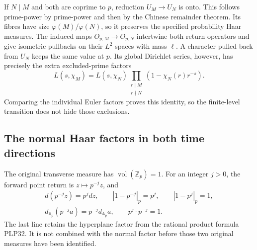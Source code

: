 If $N\mid M$ and both are coprime to $p$, reduction
$U_M\to U_N$ is onto. This follows prime-power by prime-power
and then by the Chinese remainder theorem. Its fibres have size
$\varphi(M)/\varphi(N)$, so it preserves the specified probability
Haar measures. The induced maps $O_{p,M}\to O_{p,N}$ intertwine
both return operators and give isometric pullbacks on their
$L^2$ spaces with mass $\ell$. A character pulled back from
$U_N$ keeps the same value at $p$. Its global Dirichlet series,
however, has precisely the extra excluded-prime factors
\begin{equation}\tag{PHS18}
 L(s,\chi_M)=L(s,\chi_N)
       \prod_{\substack{r\mid M\\r\nmid N}}
                      (1-\chi_N(r)r^{-s}).
\end{equation}
Comparing the individual Euler factors proves this identity, so
the finite-level transition does not hide those exclusions.

\subsection{The normal Haar factors in both time directions}

The original transverse measure has
$\operatorname{vol}(\mathbb Z_p)=1$. For an integer $j>0$,
the forward point return is $z\mapsto p^{-j}z$, and
\begin{equation}\tag{PHS19}
 \begin{gathered}
 d(p^{-j}z)=p^jdz,\qquad
 |1-p^{-j}|_p=p^j,\qquad |1-p^j|_p=1,\\
 d_{\mathbb A_p}(p^{-j}a)=p^{-j}d_{\mathbb A_p}a,
 \qquad p^j\cdot p^{-j}=1.
 \end{gathered}
\end{equation}
The last line retains the hyperplane factor from the rational
product formula PLP32. It is not combined with the normal factor
before those two original measures have been identified.

